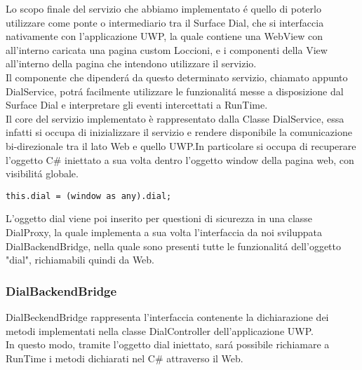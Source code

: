 Lo scopo finale del servizio che abbiamo implementato é quello di poterlo utilizzare come ponte o intermediario tra il Surface Dial, che si interfaccia nativamente con l'applicazione UWP, la quale contiene una WebView con all'interno caricata una pagina custom Loccioni, e i componenti della View all'interno della pagina che intendono utilizzare il servizio.\\

Il componente che dipenderá da questo determinato servizio, chiamato appunto DialService, potrá facilmente utilizzare le funzionalitá messe a disposizione dal Surface Dial e interpretare gli eventi intercettati a RunTime.\\

Il core del servizio implementato è rappresentato dalla Classe DialService, essa infatti si occupa di inizializzare il servizio e rendere disponibile la comunicazione bi-direzionale tra il lato Web e quello UWP.In particolare si occupa di recuperare l'oggetto C\# iniettato a sua volta dentro l'oggetto window della pagina web, con visibilitá globale.\\

\vspace{1.0cm}
\begin{lstlisting}[caption={Recupero oggetto C\#},style=javaScriptCode]
	this.dial = (window as any).dial;
\end{lstlisting} 
\vspace{1.0cm}

L'oggetto dial viene poi inserito per questioni di sicurezza in una classe DialProxy, la quale implementa a sua volta l'interfaccia da noi sviluppata DialBackendBridge, nella quale sono presenti tutte le funzionalitá dell'oggetto "dial", richiamabili quindi da Web.

\subsubsection{DialBackendBridge}

DialBeckendBridge rappresenta l'interfaccia contenente la dichiarazione dei metodi implementati nella classe DialController dell'applicazione UWP.\\
In questo modo, tramite l'oggetto dial iniettato, sará possibile richiamare a RunTime i metodi dichiarati nel C\# attraverso il Web.\\

